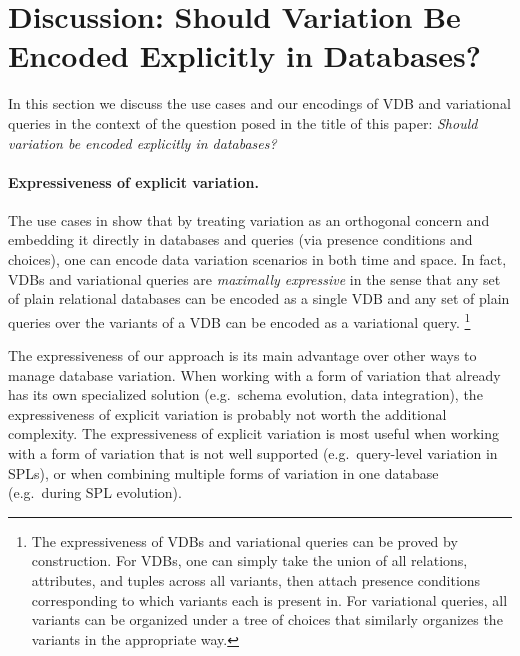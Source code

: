 \section{Discussion: Should Variation Be Encoded Explicitly in Databases?}
\label{sec:usecase-disc}
In this section we discuss the use cases and our encodings of VDB and variational queries
in the context of the question posed in the title of this paper: \emph{Should
variation be encoded explicitly in databases?}


\paragraph{Expressiveness of explicit variation.}
%
The use cases in  show that by treating
variation as an orthogonal concern and embedding it directly in databases and
queries (via presence conditions and choices), one can encode data variation
scenarios in both time and space.
%
In fact, VDBs and variational queries are \emph{maximally expressive} in the sense that
any set of plain relational databases can be encoded as a single VDB and any
set of plain queries over the variants of a VDB can be encoded as a variational query.%
%
\footnote{The expressiveness of VDBs and variational queries can be proved by
construction. For VDBs, one can simply take the union of all relations,
attributes, and tuples across all variants, then attach presence conditions
corresponding to which variants each is present in. For variational queries, all variants
can be organized under a tree of choices that similarly organizes the variants
in the appropriate way.}


The expressiveness of our approach is its main advantage over other ways to
manage database variation. When working with a form of variation that already
has its own specialized solution (e.g.\ schema evolution, data integration),
the expressiveness of explicit variation is probably not worth the additional
complexity.
%
The expressiveness of explicit variation is most useful when working with a
form of variation that is not well supported (e.g.\ query-level variation in
SPLs), or when combining multiple forms of variation in one database (e.g.\
during SPL evolution).


